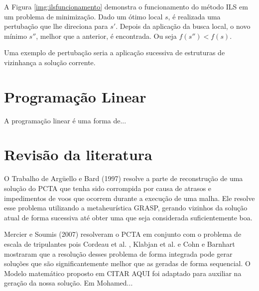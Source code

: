 A Figura \ref{img:ilsfuncionamento} demonstra o funcionamento do método ILS em um problema de minimização. Dado um ótimo local $s$, é realizada uma pertubação que lhe direciona para $s{'}$. Depois da aplicação da busca local, o novo mínimo $s{''}$, melhor que a anterior, é encontrada. Ou seja $f(s{''}) < f(s)$.

Uma exemplo de pertubação seria a aplicação sucessiva de estruturas de vizinhança a solução corrente.

\section{Programação Linear}

A programação linear é uma forma de...

\section{Revisão da literatura}
		
		O Trabalho de Argüello e Bard \citep{arguelo1007} (1997) resolve a parte de reconstrução de uma solução do PCTA que tenha sido corrompida por causa de atrasos e impedimentos de voos que ocorrem durante a execução de uma malha. Ele resolve esse problema utilizando a metaheurística GRASP, gerando vizinhos da solução atual de forma sucessiva até obter uma que seja considerada suficientemente boa.
		
		Mercier e Soumis \cite{mercier2007} (2007) resolveram o PCTA em conjunto com o problema de escala de tripulantes pois Cordeau et al. \cite{cordeau2001}, Klabjan et al. \cite{klabjan2002} e Cohn e Barnhart \cite{mainville2003} mostraram que a resolução desses problema de forma integrada pode gerar soluções que são significantemente melhor que as geradas de forma sequencial. O Modelo matemático proposto em CITAR AQUI foi adaptado para auxiliar na geração da nossa solução. 
		Em \cite{mohamed2011} Mohamed...
		
